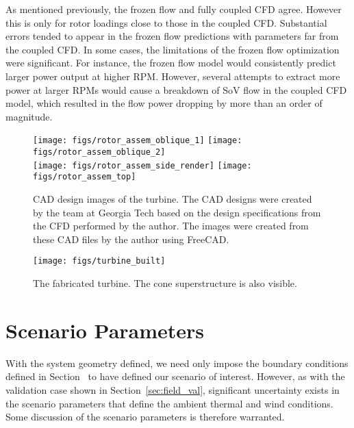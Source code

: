 As mentioned previously, the frozen flow and fully coupled CFD
agree. However this is only for rotor loadings close to those in the
coupled CFD. Substantial errors tended to appear in the frozen flow
predictions with parameters far from the coupled CFD. In some cases, the
limitations of the frozen flow optimization were significant. For
instance, the frozen flow model would consistently predict larger power
output at higher RPM. However, several attempts to extract more power at
larger RPMs would cause a breakdown of SoV flow in the coupled CFD
model, which resulted in the flow power dropping by more than an order
of magnitude.%

  \begin{figure}
   \centering
   \texttt{[image: figs/rotor\_assem\_oblique\_1]}
   \hfill
   \texttt{[image: figs/rotor\_assem\_oblique\_2]}
   \\
   \vspace{1em}
   \texttt{[image: figs/rotor\_assem\_side\_render]}
   \hfill
   \texttt{[image: figs/rotor\_assem\_top]}
   \\   
   \caption{CAD design images of the turbine. The CAD designs were
   created by the team at Georgia Tech based on the design
   specifications from the CFD performed by the author. The images were
   created from these CAD files by the author using
   FreeCAD\cite{Falck}.}  
   \label{fig:cad_turbine}
  \end{figure}


  \begin{figure}
   \centering
   \texttt{[image: figs/turbine\_built]}
   \caption{The fabricated turbine. The cone superstructure is also
   visible.} 
   \label{fig:turbine_built}
  \end{figure}


\section{Scenario Parameters}
\label{subsec:scenario_param}

With the system geometry defined, we need only impose the boundary
conditions defined in Section~\label{sec:bc} to have defined our
scenario of interest. However, as with the validation case shown in
Section~\ref{sec:field_val}, significant uncertainty exists in the
scenario parameters that define the ambient thermal and wind
conditions. Some discussion of the scenario parameters is therefore
warranted. 

